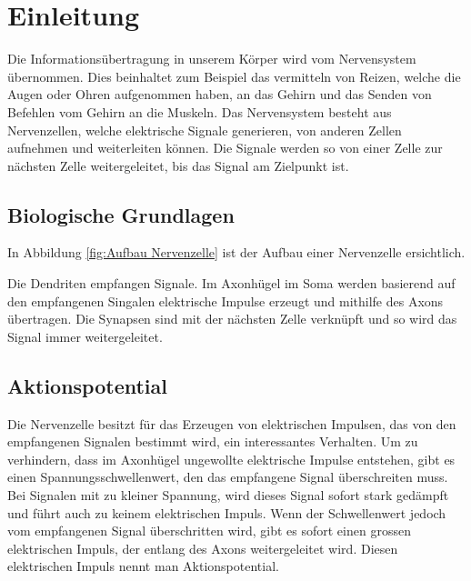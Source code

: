 \section{Einleitung}

Die Informationsübertragung in unserem Körper wird vom Nervensystem übernommen.
%
Dies beinhaltet zum Beispiel das vermitteln von Reizen, welche die Augen oder Ohren aufgenommen haben,
an das Gehirn und das Senden von Befehlen vom Gehirn an die Muskeln.
Das Nervensystem besteht aus Nervenzellen, welche elektrische Signale generieren, von anderen Zellen aufnehmen und weiterleiten können.
%
Die Signale werden so von einer Zelle zur nächsten Zelle weitergeleitet, bis das Signal am Zielpunkt ist.
\subsection{Biologische Grundlagen}
In Abbildung \ref{fig:Aufbau Nervenzelle} ist der Aufbau einer Nervenzelle ersichtlich. 


Die Dendriten empfangen Signale. 
%
Im Axonhügel im Soma werden basierend auf den empfangenen Singalen elektrische Impulse erzeugt und mithilfe des Axons übertragen.
%
%
%
Die Synapsen sind mit der nächsten Zelle verknüpft und so wird das Signal immer weitergeleitet.
%

\subsection{Aktionspotential}
Die Nervenzelle besitzt für das Erzeugen von elektrischen Impulsen,
das von den empfangenen Signalen bestimmt wird, ein interessantes Verhalten.
Um zu verhindern, dass im Axonhügel ungewollte elektrische Impulse entstehen, gibt es einen Spannungsschwellenwert,
den das empfangene Signal überschreiten muss.
Bei Signalen mit zu kleiner Spannung, wird dieses Signal sofort stark gedämpft und führt auch zu keinem elektrischen Impuls.
Wenn der Schwellenwert jedoch vom empfangenen Signal überschritten wird, gibt es sofort einen grossen elektrischen Impuls,
%
der entlang des Axons weitergeleitet wird. 
Diesen elektrischen Impuls nennt man Aktionspotential.
%


